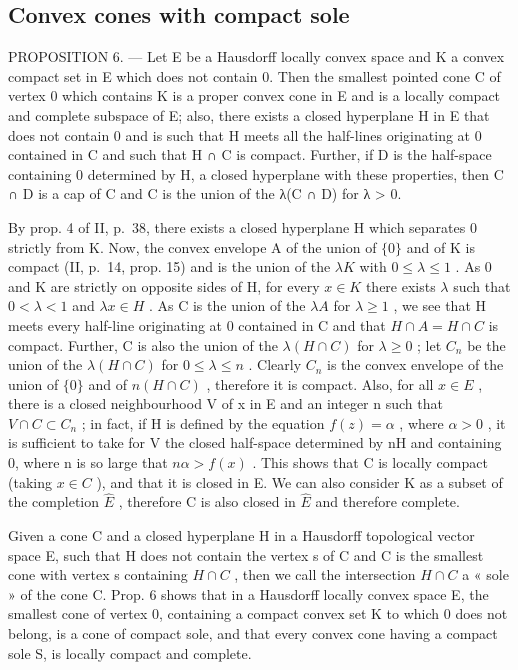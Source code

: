 \subsection{Convex cones with compact sole}

PROPOSITION 6. --- Let E be a Hausdorff locally convex space and K a convex compact set in E which does not contain 0. Then the smallest pointed cone C of vertex 0 which contains K is a proper convex cone in E and is a locally compact and complete subspace of E; also, there exists a closed hyperplane H in E that does not contain 0 and is such that H meets all the half-lines originating at 0 contained in C and such that H ∩ C is compact. Further, if D is the half-space containing 0 determined by H, a closed hyperplane with these properties, then C ∩ D is a cap of C and C is the union of the λ(C ∩ D) for λ \textgreater{} 0.

By prop. 4 of II, p.~38, there exists a closed hyperplane H which separates 0 strictly from K. Now, the convex envelope A of the union of \(\{0\}\) and of K is compact (II, p.~14, prop. 15) and is the union of the \(\lambda K\) with \(0 \leqslant \lambda \leqslant 1\) . As 0 and K are strictly on opposite sides of H, for every \(x \in K\) there exists \(\lambda\) such that \(0 < \lambda < 1\) and \(\lambda x \in H\) . As C is the union of the \(\lambda A\) for \(\lambda \geqslant 1\) , we see that H meets every half-line originating at 0 contained in C and that \(H \cap A = H \cap C\) is compact. Further, C is also the union of the \(\lambda(H \cap C)\) for \(\lambda \geqslant 0\) ; let \(C_n\) be the union of the \(\lambda(H \cap C)\) for \(0 \leqslant \lambda \leqslant n\) . Clearly \(C_n\) is the convex envelope of the union of \(\{0\}\) and of \(n(H \cap C)\) , therefore it is compact. Also, for all \(x \in E\) , there is a closed neighbourhood V of x in E and an integer n such that \(V \cap C \subset C_n\) ; in fact, if H is defined by the equation \(f(z) = \alpha\) , where \(\alpha > 0\) , it is sufficient to take for V the closed half-space determined by nH and containing 0, where n is so large that \(n\alpha > f(x)\) . This shows that C is locally compact (taking \(x \in C\) ), and that it is closed in E. We can also consider K as a subset of the completion \(\hat{E}\) , therefore C is also closed in \(\hat{E}\) and therefore complete.

Given a cone C and a closed hyperplane H in a Hausdorff topological vector space E, such that H does not contain the vertex s of C and C is the smallest cone with vertex s containing \(H \cap C\) , then we call the intersection \(H \cap C\) a « sole » of the cone C. Prop. 6 shows that in a Hausdorff locally convex space E, the smallest cone of vertex 0, containing a compact convex set K to which 0 does not belong, is a cone of compact sole, and that every convex cone having a compact sole S, is locally compact and complete.

